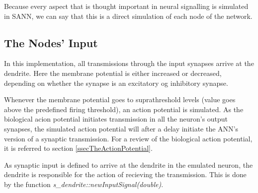 	Because every aspect that is thought important in neural signalling is simulated in SANN, 
		we can say that this is a direct simulation of each node of the network.   %
	

	\subsection{The Nodes' Input}
	In this implementation, all transmissions through the input synapses arrive at the dendrite.
	Here the membrane potential is either increased or decreased, depending on whether the synapse is an excitatory og inhibitory synapse.

	Whenever the membrane potential goes to suprathreshold levels (value goes above the predefined firing threshold), an action potential is simulated.
	As the biological acion potential initiates transmission in all the neuron's output synapses, the simulated action potential will after a delay initiate the ANN's version of a synaptic transmission.
	For a review of the biological action potential, it is referred to section \ref{ssecTheActionPotential}. %
	

	As synaptic input is defined to arrive at the dendrite in the emulated neuron, the dendrite is responsible for the action of recieving the transmission.
	This is done by the function \emph{s\_dendrite::newInputSignal(double)}.
	

